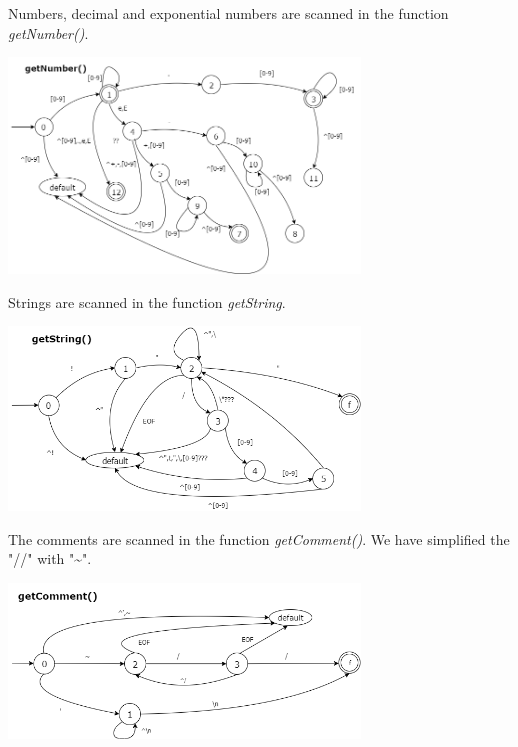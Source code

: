 \documentclass[10pt,a4paper,titlepage]{article}
\begin{document}
\begin{justify}
Numbers, decimal and exponential numbers are scanned in the function \textit{getNumber()}.
\end{justify}
\begin{center}
  \includegraphics[width=0.7\textwidth]{img/getNumber.png}
\end{center}

\begin{justify}
Strings are scanned in the function \textit{getString}.
\end{justify}
\begin{center}
  \includegraphics[width=0.7\textwidth]{img/getString.png}
\end{center}

\begin{justify}
The comments are scanned in the function \textit{getComment()}. We have simplified the "//" with "\textasciitilde".
\end{justify}
\begin{center}
  \includegraphics[width=0.7\textwidth]{img/getComment.png}
\end{center}
\end{document}
